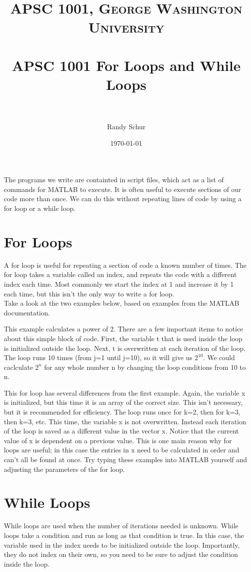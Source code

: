 \documentclass[paper=a4, fontsize=11pt]{scrartcl} %
\title{	
\normalfont \normalsize 
\textsc{APSC 1001, George Washington University} \\ [25pt] %
\horrule{0.5pt} \\[0.4cm] %
\huge APSC 1001 For Loops and While Loops\\ %
\horrule{2pt} \\[0.5cm] %
}
\author{\normalsize Randy Schur } %
\date{\normalsize \today } %
\numberwithin{equation}{section} %
\numberwithin{figure}{section} %
\numberwithin{table}{section} %
\begin{document}
\maketitle %
The programs we write are containted in script files, which act as a list of commands for MATLAB to execute. 
It is often useful to execute sections of our code more than once. 
We can do this without repeating lines of code by using a for loop or a while loop.

\section{For Loops}
 A for loop is useful for repeating a section of code a known number of times. The for loop takes a variable called an index, and repeats the code with a different index each time. Most commonly we start the index at 1 and increase it by 1 each time, but this isn't the only way to write a for loop. \\
 
Take a look at the two examples below, based on examples from the MATLAB documentation.

This example calculates a power of 2. 
There are a few important items to notice about this simple block of code.
First, the variable t that is used inside the loop is initialized outside the loop. 
Next, t is overwritten at each iteration of the loop. 
The loop runs 10 times (from j=1 until j=10), so it will give us $2^{10}$. 
We could caclculate $2^n$ for any whole number n by changing the loop conditions from 10 to n.



This for loop has several differences from the first example. 
Again, the variable x is initialized, but this time it is an array of the correct size. This isn't necessary, but it is recommended for efficiency.
The loop runs once for k=2, then for k=3, then k=3, etc.
This time, the variable x is not overwritten. Instead each iteration of the loop is saved as a different value in the vector x.
Notice that the current value of x is dependent on a previous value. This is one main reason why for loops are useful; in this case the entries in x need to be calculated in order and can't all be found at once.
Try typing these examples into MATLAB yourself and adjusting the parameters of the for loop.

\section{While Loops}
While loops are used when the number of iterations needed is unknown. 
While loops take a condition and run as long as that condition is true.
In this case, the variable used in the index needs to be initialized outside the loop.
Importantly, they do not index on their own, so you need to be sure to adjust the condition inside the loop.\\
 
\end{document}
